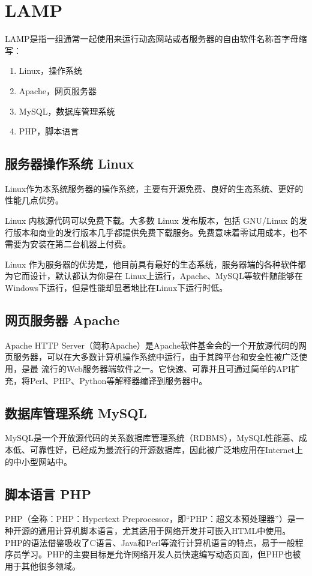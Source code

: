 \section{LAMP}

\label{lamp}
LAMP是指一组通常一起使用来运行动态网站或者服务器的自由软件名称首字母缩写：

\begin{enumerate}
\item Linux，操作系统
\item Apache，网页服务器
\item MySQL，数据库管理系统
\item PHP，脚本语言
\end{enumerate}

\subsection{服务器操作系统 Linux}

Linux作为本系统服务器的操作系统，主要有开源免费、良好的生态系统、更好的性能几点优势。

Linux 内核源代码可以免费下载。大多数 Linux 发布版本，包括 GNU/Linux 的发行版本和商业的发行版本几乎都提供免费下载服务。免费意味着零试用成本，也不需要为安装在第二台机器上付费。

Linux 作为服务器的优势是，他目前具有最好的生态系统，服务器端的各种软件都为它而设计，默认都认为你是在 Linux上运行，Apache、MySQL等软件随能够在Windows下运行，但是性能却显著地比在Linux下运行时低。

\subsection{网页服务器 Apache}
Apache HTTP Server（简称Apache）是Apache软件基金会的一个开放源代码的网页服务器，可以在大多数计算机操作系统中运行，由于其跨平台和安全性被广泛使用，是最 流行的Web服务器端软件之一。它快速、可靠并且可通过简单的API扩充，将Perl、PHP、Python等解释器编译到服务器中。
\subsection{数据库管理系统 MySQL}
MySQL是一个开放源代码的关系数据库管理系统（RDBMS），MySQL性能高、成本低、可靠性好，已经成为最流行的开源数据库，因此被广泛地应用在Internet上的中小型网站中。
\subsection{脚本语言 PHP}
PHP（全称：PHP：Hypertext Preprocessor，即“PHP：超文本预处理器”）是一种开源的通用计算机脚本语言，尤其适用于网络开发并可嵌入HTML中使用。PHP的语法借鉴吸收了C语言、Java和Perl等流行计算机语言的特点，易于一般程序员学习。PHP的主要目标是允许网络开发人员快速编写动态页面，但PHP也被用于其他很多领域。

